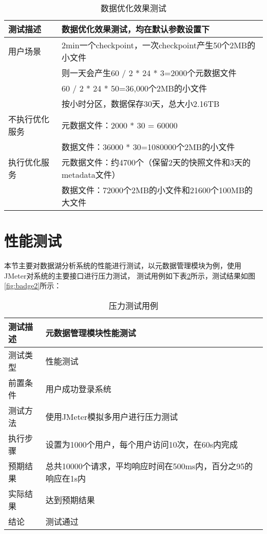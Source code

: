\begin{table}[H]
  \centering
  \caption{数据优化效果测试}
  \label{tab:exampletable15}
  \begin{tabular}{ll}
    \toprule
    测试描述         & 数据优化效果测试，均在默认参数设置下         \\
    \midrule
    用户场景         & 2min一个checkpoint，一次checkpoint产生50个2MB的小文件   \\
                   & 则一天会产生60 / 2 * 24 * 3=2000个元数据文件          \\
                   & 60 / 2 * 24 * 50=36,000个2MB的小文件              \\
                   & 按小时分区，数据保存30天，总大小2.16TB         \\
    不执行优化服务         & 元数据文件：2000 * 30 = 60000         \\
                        & 数据文件：36000 * 30=1080000个2MB的小文件         \\
    执行优化服务       & 元数据文件：约4700个（保留2天的快照文件和3天的metadata文件）        \\
                    & 数据文件：72000个2MB的小文件和21600个100MB的大文件        \\
    \bottomrule
  \end{tabular}
\end{table}

\section{性能测试}

本节主要对数据湖分析系统的性能进行测试，以元数据管理模块为例，使用JMeter对系统的主要接口进行压力测试\cite{33}，
测试用例如下表\ref{tab:exampletable16}所示，测试结果如图\ref{fig:badge2}所示：

\begin{table}[H]
  \centering
  \caption{压力测试用例}
  \label{tab:exampletable16}
  \begin{tabular}{ll}
    \toprule
    测试描述         & 元数据管理模块性能测试         \\
    \midrule
    测试类型         & 性能测试         \\
    前置条件         & 用户成功登录系统         \\
    测试方法         & 使用JMeter模拟多用户进行压力测试        \\
    执行步骤         & 设置为1000个用户，每个用户访问10次，在60s内完成      \\
    预期结果         & 总共10000个请求，平均响应时间在500ms内，百分之95的响应在1s内      \\
    实际结果         & 达到预期结果           \\
    结论            & 测试通过           \\
    \bottomrule
  \end{tabular}
\end{table}


